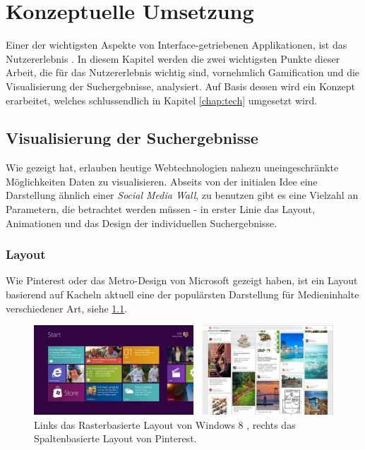 \documentclass[12pt,twoside]{book}
\begin{document}
\chapter{Konzeptuelle Umsetzung}\label{chap:concept}

Einer der wichtigsten Aspekte von Interface-getriebenen Applikationen, ist das Nutzererlebnis \citep{garrett2010elements, 8 - 17}. In diesem Kapitel werden die zwei wichtigsten Punkte dieser Arbeit, die für das Nutzererlebnis wichtig sind, vornehmlich Gamification und die Visualisierung der Suchergebnisse, analysiert. Auf Basis dessen wird ein Konzept erarbeitet, welches schlussendlich in Kapitel \ref{chap:tech} umgesetzt wird.

\section{Visualisierung der Suchergebnisse}\label{chap:concept:wall}

Wie \cite{bostock2011d3} gezeigt hat, erlauben heutige Webtechnologien nahezu uneingeschränkte Möglichkeiten Daten zu visualisieren. Abseits von der initialen Idee eine Darstellung ähnlich einer \textit{Social Media Wall}, zu benutzen gibt es eine Vielzahl an Parametern, die betrachtet werden müssen - in erster Linie das Layout, Animationen und das Design der individuellen Suchergebnisse.

\subsection{Layout}

Wie Pinterest\cite{pinterest} oder das Metro-Design von Microsoft gezeigt haben, ist ein Layout basierend auf Kacheln aktuell eine der populärsten Darstellung für Medieninhalte verschiedener Art, siehe \ref{fig:metro_pinterest}.

\begin{figure}[htbp]
    \centering
    \includegraphics[width=1.0\textwidth]{images/metro_pinterest.png}
    \caption{Links das Rasterbasierte Layout von Windows 8 \cite{metrodesign}, rechts das Spaltenbasierte Layout von Pinterest.}
    \label{fig:metro_pinterest}
  \end{figure}
\end{document}
